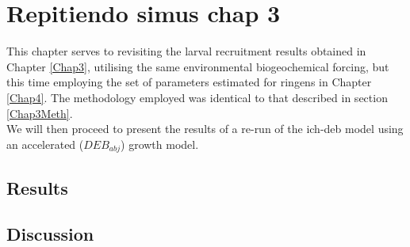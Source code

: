 \chapter{Repitiendo simus chap 3}\label{Chap5}

\clearpage

This chapter serves to revisiting the larval recruitment results obtained in Chapter \ref{Chap3}, utilising the same environmental biogeochemical forcing, but this time employing the set of parameters estimated for \gls{ringens} in Chapter \ref{Chap4}. The methodology employed was identical to that described in section \ref{Chap3Meth}.\\

We will then proceed to present the results of a re-run of the \gls{ich-deb} model using an accelerated ($DEB_{abj}$) growth model.

\clearpage
\section{Results}

\clearpage
\section{Discussion}